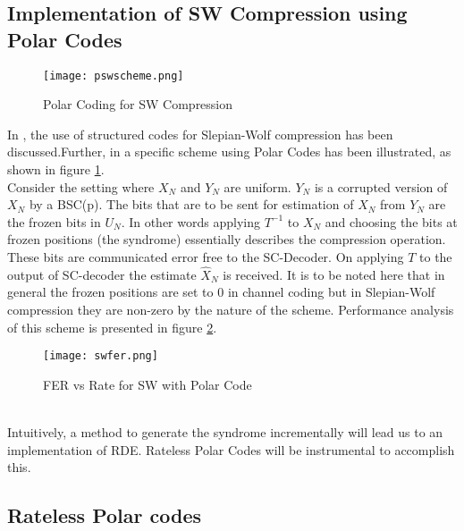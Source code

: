 \documentclass[
11pt, %
a4paper, %
oneside, %
headinclude,footinclude, %
BCOR5mm, %
]{scrartcl}
\begin{document}
\subsection{Implementation of SW Compression using Polar Codes}
\begin{figure}[h]
 \begin{center}
    \texttt{[image: pswscheme.png]}
  \end{center}
  \caption{Polar Coding for SW Compression}
  \label{fig:pswscheme}
\end{figure}
In \cite{discus}, the use of structured codes for Slepian-Wolf compression has been discussed.Further, in \cite{pslep} a specific scheme using Polar Codes has been illustrated, as shown in figure \ref{fig:pswscheme}.\\
Consider the setting where $X_N$ and $Y_N$ are uniform. $Y_N$ is a corrupted version of $X_N$ by a BSC(p). The bits that are to be sent for estimation of $X_N$ from $Y_N$ are the frozen bits in $U_N$. In other words applying $T^{-1}$ to $X_N$ and choosing the bits at frozen positions (the syndrome) essentially describes the compression operation. These bits are communicated error free to the SC-Decoder. On applying $T$ to the output of SC-decoder the estimate $\hat{X}_N$ is received. It is to be noted here that in general the frozen positions are set to 0 in channel coding but in Slepian-Wolf compression they are non-zero by the nature of the scheme. Performance analysis of this scheme is presented in figure \ref{fig:swfer}.
\begin{figure}[h]
 \begin{center}
    \texttt{[image: swfer.png]}
  \end{center}
  \caption{FER vs Rate for SW with Polar Code}
  \label{fig:swfer}
\end{figure}\\
Intuitively, a method to generate the syndrome incrementally will lead us to an implementation of RDE. Rateless Polar Codes will be instrumental to accomplish this.

\subsection{Rateless Polar codes}
\end{document}

